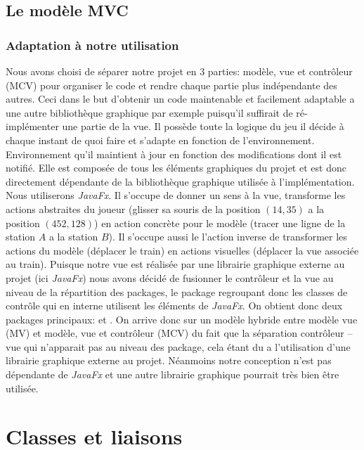 \documentclass[report, backcover, french, nodocumentinfo]{upmethodology-document}
\begin{document}
		\section{Le modèle MVC}
			\subsection{Adaptation à notre utilisation}
					Nous avons choisi de séparer notre projet en 3 parties: modèle, vue et contrôleur (MCV) pour organiser le code et rendre chaque partie plus indépendante des autres. Ceci dans le but d'obtenir un code maintenable et facilement adaptable a une autre bibliothèque graphique par exemple puisqu'il suffirait de ré-implémenter une partie de la vue.
					Il possède toute la logique du jeu il décide à chaque instant de quoi faire et s'adapte en fonction de l’environnement. Environnement qu'il maintient à jour en fonction des modifications dont il est notifié.
					Elle est composée de tous les éléments graphiques du projet et est donc directement dépendante de la bibliothèque graphique utilisée à l'implémentation. Nous utiliserons \textit{JavaFx}.
					Il s'occupe de donner un sens à la vue, transforme les actions abstraites du joueur (glisser sa souris de la position $(14,35)$ a la position $(452,128)$) en action concrète pour le modèle (tracer une ligne de la station $A$ a la station $B$). Il s’occupe aussi le l'action inverse de transformer les actions du modèle (déplacer le train) en actions visuelles (déplacer la vue associée au train).
					Puisque notre vue est réalisée par une librairie graphique externe au projet (ici \textit{JavaFx}) nous avons décidé de fusionner le contrôleur et la vue au niveau de la répartition des packages, le package  regroupant donc les classes de contrôle qui en interne utilisent les éléments de \textit{JavaFx}. On obtient donc deux packages principaux:  et .
				\p{}
					On arrive donc sur un modèle hybride entre modèle vue (MV) et modèle, vue et contrôleur (MCV) du fait que la séparation contrôleur -- vue qui n'apparait pas au niveau des package, cela étant du a l'utilisation d'une librairie graphique externe au projet. Néanmoins notre conception n'est pas dépendante de \textit{JavaFx} et une autre librairie graphique pourrait très bien être utilisée.

	\chapter{Classes et liaisons}
\end{document}

